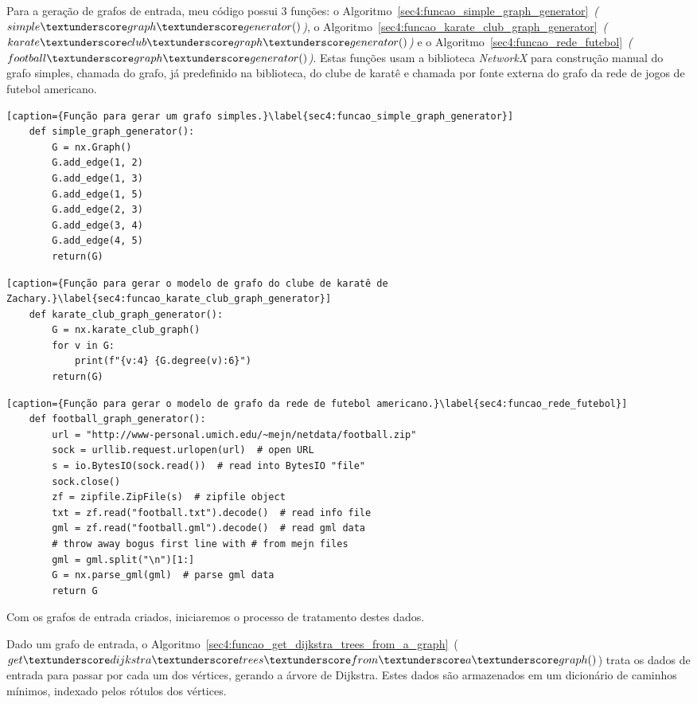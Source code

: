 Para a geração de grafos de entrada, meu código possui 3 funções: o Algoritmo~\ref{sec4:funcao_simple_graph_generator}~\emph{($simple\textunderscore graph\textunderscore generator()$)}, o Algoritmo~\ref{sec4:funcao_karate_club_graph_generator}~\emph{($karate\textunderscore club\textunderscore graph\textunderscore generator()$)} e o Algoritmo~\ref{sec4:funcao_rede_futebol}~\emph{($football\textunderscore graph\textunderscore generator()$)}. Estas funções usam a biblioteca \emph{NetworkX} para construção manual do grafo simples, chamada do grafo, já predefinido na biblioteca, do clube de karatê e chamada por fonte externa do grafo da rede de jogos de futebol americano.

\begin{lstlisting}[caption={Função para gerar um grafo simples.}\label{sec4:funcao_simple_graph_generator}]
	def simple_graph_generator():
		G = nx.Graph()
		G.add_edge(1, 2)
		G.add_edge(1, 3)
		G.add_edge(1, 5)
		G.add_edge(2, 3)
		G.add_edge(3, 4)
		G.add_edge(4, 5)
		return(G)
\end{lstlisting}

\begin{lstlisting}[caption={Função para gerar o modelo de grafo do clube de karatê de Zachary.}\label{sec4:funcao_karate_club_graph_generator}]
	def karate_club_graph_generator():
		G = nx.karate_club_graph()
		for v in G:
			print(f"{v:4} {G.degree(v):6}")
		return(G)
\end{lstlisting}

\begin{lstlisting}[caption={Função para gerar o modelo de grafo da rede de futebol americano.}\label{sec4:funcao_rede_futebol}]
	def football_graph_generator():
		url = "http://www-personal.umich.edu/~mejn/netdata/football.zip"
		sock = urllib.request.urlopen(url)  # open URL
		s = io.BytesIO(sock.read())  # read into BytesIO "file"
		sock.close()
		zf = zipfile.ZipFile(s)  # zipfile object
		txt = zf.read("football.txt").decode()  # read info file
		gml = zf.read("football.gml").decode()  # read gml data
		# throw away bogus first line with # from mejn files
		gml = gml.split("\n")[1:]
		G = nx.parse_gml(gml)  # parse gml data
		return G
\end{lstlisting}

Com os grafos de entrada criados, iniciaremos o processo de tratamento destes dados.

Dado um grafo de entrada, o Algoritmo~\ref{sec4:funcao_get_dijkstra_trees_from_a_graph}~(\emph{$get\textunderscore dijkstra\textunderscore trees\textunderscore from\textunderscore a\textunderscore graph()$}) trata os dados de entrada para passar por cada um dos vértices, gerando a árvore de Dijkstra. Estes dados são armazenados em um dicionário de caminhos mínimos, indexado pelos rótulos dos vértices.

